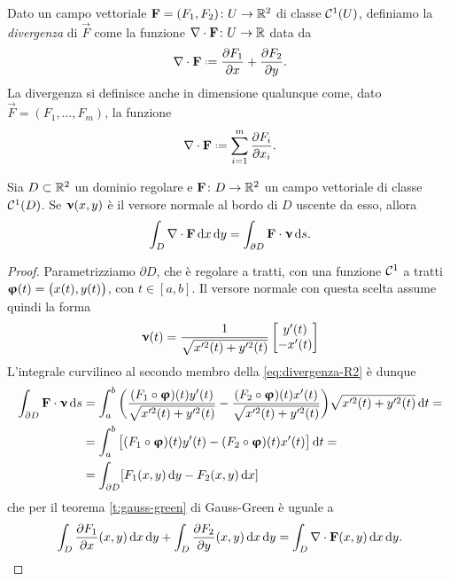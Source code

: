 Dato un campo vettoriale $\mathbf{F}=(F_1,F_2)\colon U\to\mathbb{R}^2$ di classe $\mathcal{C}^{{1}}(U)$, definiamo la \emph{divergenza} di $\vec F$ come la funzione $\nabla\cdot\mathbf{F}\colon U\to\mathbb{R}$ data da
\begin{equation}
	\div\vec F\defeq\drp{F_1}{x}+\drp{F_2}{y}.
\end{equation}
La divergenza si definisce anche in dimensione qualunque come, dato $\vec F=(F_1,\dots,F_m)$, la funzione
\begin{equation}
	\div\vec F\defeq\sum_{i=1}^m\drp{F_i}{x_i}.
\end{equation}
\begin{teorema} \label{t:divergenza-R2}
	Sia $D\subset\mathbb{R}^2$ un dominio regolare e $\mathbf{F}\colon D\to\mathbb{R}^2$ un campo vettoriale di classe $\mathcal{C}^{{1}}(D)$.
	Se $\bm{\upnu}(x,y)$ è il versore normale al bordo di $D$ uscente da esso, allora
	\begin{equation}
		\int_D\nabla\cdot\mathbf{F}\,\textup{d} x\,\textup{d} y=\int_{\partial D}{\mathbf{F}}\cdot{\bm{\upnu}}\,\textup{d} s.
		\label{eq:divergenza-R2}
	\end{equation}
\end{teorema}
\begin{proof}
	Parametrizziamo $\partial D$, che è regolare a tratti, con una funzione $\mathcal{C}^{{1}}$ a tratti $\bm{\upvarphi}(t)=\big(x(t),y(t)\big)$, con $t\in[a,b]$.
	Il versore normale con questa scelta assume quindi la forma
	\begin{equation*}
		\bm{\upnu}(t)=\frac1{\sqrt{x'^2(t)+y'^2(t)}}
		\begin{bmatrix}
			y'(t)\\-x'(t)
		\end{bmatrix}
	\end{equation*}
	L'integrale curvilineo al secondo membro della \eqref{eq:divergenza-R2} è dunque
	\begin{equation}
		\begin{split}
			\int_{\partial D}{\mathbf{F}}\cdot{\bm{\upnu}}\,\textup{d} s&=\int_a^b\bigg(\frac{(F_1\circ\bm{\upvarphi})(t)y'(t)}{\sqrt{x'^2(t)+y'^2(t)}}-\frac{(F_2\circ\bm{\upvarphi})(t)x'(t)}{\sqrt{x'^2(t)+y'^2(t)}}\bigg)\sqrt{x'^2(t)+y'^2(t)}\,\textup{d} t=\\
			&=\int_a^b\big[(F_1\circ\bm{\upvarphi})(t)y'(t)-(F_2\circ\bm{\upvarphi})(t)x'(t)\big]\,\textup{d} t=\\
			&=\int_{\partial D}[F_1(x,y)\,\textup{d} y-F_2(x,y)\,\textup{d} x]
		\end{split}
	\end{equation}
	che per il teorema \ref{t:gauss-green} di Gauss-Green è uguale a
	\begin{equation}
		\int_D\frac{\partial {F_1}}{\partial {x}}(x,y)\,\textup{d} x\,\textup{d} y+\int_D\frac{\partial {F_2}}{\partial {y}}(x,y)\,\textup{d} x\,\textup{d} y=\int_D\nabla\cdot\mathbf{F}(x,y)\,\textup{d} x\,\textup{d} y.\qedhere
	\end{equation}
\end{proof}
